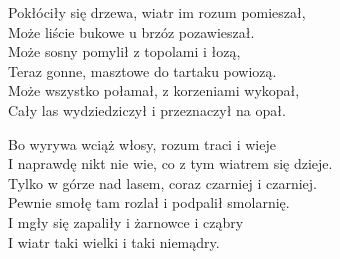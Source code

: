 \begin{text}
Pokłóciły się drzewa, wiatr im rozum pomieszał,\\
Może liście bukowe u brzóz pozawieszał.\\
Może sosny pomylił z topolami i łozą,\\
Teraz gonne, masztowe do tartaku powiozą.\\
Może wszystko połamał, z korzeniami wykopał,\\
Cały las wydziedziczył i przeznaczył na opał.

Bo wyrywa wciąż włosy, rozum traci i wieje\\
I naprawdę nikt nie wie, co z tym wiatrem się dzieje.\\
Tylko w górze nad lasem, coraz czarniej i czarniej.\\
Pewnie smołę tam rozlał i podpalił smolarnię.\\
I mgły się zapaliły i żarnowce i cząbry\\
I wiatr taki wielki i taki niemądry.
\end{text}
\begin{chord}
\end{chord}